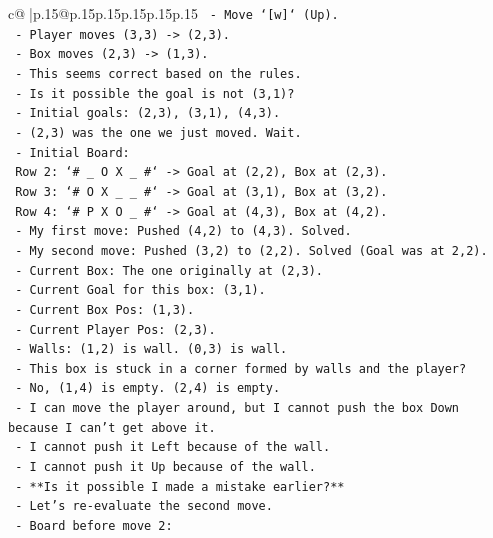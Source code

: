 \documentclass{article}
\begin{document}
{\begin{supertabular}{c@{$\;$}|p{.15\linewidth}@{}p{.15\linewidth}p{.15\linewidth}p{.15\linewidth}p{.15\linewidth}p{.15\linewidth}}
{{{\texttt{    {-} Move `{[}w{]}` (Up).} \\
\texttt{    {-} Player moves (3,3) {-}> (2,3).} \\
\texttt{    {-} Box moves (2,3) {-}> (1,3).} \\
\texttt{    {-} This seems correct based on the rules.} \\
\texttt{  {-} Is it possible the goal is not (3,1)?} \\
\texttt{    {-} Initial goals: (2,3), (3,1), (4,3).} \\
\texttt{    {-} (2,3) was the one we just moved. Wait.} \\
\texttt{    {-} Initial Board:} \\
\texttt{      Row 2: `\# \_ O X \_ \#` {-}> Goal at (2,2), Box at (2,3).} \\
\texttt{      Row 3: `\# O X \_ \_ \#` {-}> Goal at (3,1), Box at (3,2).} \\
\texttt{      Row 4: `\# P X O \_ \#` {-}> Goal at (4,3), Box at (4,2).} \\
\texttt{    {-} My first move: Pushed (4,2) to (4,3). Solved.} \\
\texttt{    {-} My second move: Pushed (3,2) to (2,2). Solved (Goal was at 2,2).} \\
\texttt{    {-} Current Box: The one originally at (2,3).} \\
\texttt{    {-} Current Goal for this box: (3,1).} \\
\texttt{    {-} Current Box Pos: (1,3).} \\
\texttt{    {-} Current Player Pos: (2,3).} \\
\texttt{    {-} Walls: (1,2) is wall. (0,3) is wall.} \\
\texttt{    {-} This box is stuck in a corner formed by walls and the player?} \\
\texttt{    {-} No, (1,4) is empty. (2,4) is empty.} \\
\texttt{    {-} I can move the player around, but I cannot push the box Down because I can't get above it.} \\
\texttt{    {-} I cannot push it Left because of the wall.} \\
\texttt{    {-} I cannot push it Up because of the wall.} \\
\texttt{    {-} **Is it possible I made a mistake earlier?**} \\
\texttt{      {-} Let's re{-}evaluate the second move.} \\
\texttt{      {-} Board before move 2:} \\
}}}
\end{supertabular}}
\end{document}
